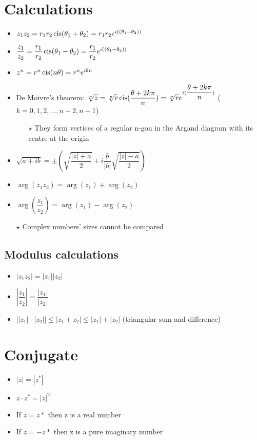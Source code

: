 \section{Calculations}
\begin{itemize}
	\item $z_1z_2=r_1r_2\operatorname{cis}(\theta_1+\theta_2)=r_1r_2e^{i((\theta_1+\theta_2))}$
	\item $\dfrac{z_1}{z_2}=\dfrac{r_1}{r_2}\operatorname{cis}(\theta_1-\theta_2)=\dfrac{r_1}{r_2}e^{i((\theta_1-\theta_2))}$
	\item $z^n = r^n\operatorname{cis}(n\theta)=r^ne^{i\theta n}$
	\item De Moivre's theorem: $\sqrt[n]{z}=\sqrt[n]{r}\operatorname{cis}(\dfrac{\theta+2k\pi}{n})=\sqrt[n]{r}e^{i(\dfrac{\theta+2k\pi}{n})}$ ($k=0,1,2,\dots,n-2,n-1$)
	\begin{itemize}
		\item[$\star$] They form vertices of a regular n-gon in the Argand diagram with its centre at the origin
	\end{itemize}
	\item $\sqrt{a+ib}=\pm(\sqrt{\dfrac{|z|+a}{2}}+i\dfrac{b}{|b|}\sqrt{\dfrac{|z|-a}{2}})$
	\item $\arg(z_1z_2)=\arg(z_1)+\arg(z_2)$
	\item $\arg(\dfrac{z_1}{z_2})=\arg(z_1)-\arg(z_2)$
	\item[$\star$] Complex numbers' sizes cannot be compared
\end{itemize}
\subsection{Modulus calculations}
\begin{itemize}
	\item $|z_1z_2|=|z_1||z_2|$
	\item $|\dfrac{z_1}{z_2}|=\dfrac{|z_1|}{|z_2|}$
	\item $||z_1|-|z_2|| \leq |z_1 \pm z_2| \leq |z_1|+|z_2|$ (triangular sum and difference)
\end{itemize}


\section{Conjugate}
\begin{itemize}
	\item $|z|=|z^*|$
	\item $z\cdot z^*= |z|^2$
	\item If $z=z*$ then z is a real number
	\item If $z=-z*$ then z is a pure imaginary number
\end{itemize}

